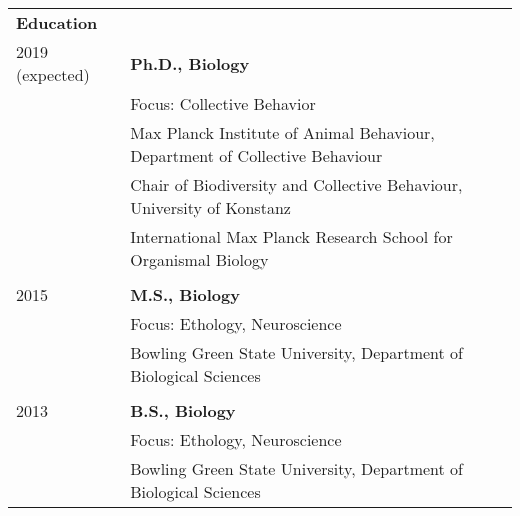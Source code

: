 \documentclass[letterpaper,10pt,oneside]{article}
\begin{document}
\noindent \begin{longtable}{@{} l p{5.3in}l}



\Large{\textbf{Education}} \vspace{5mm} \\
 \large{2019 (expected)} 
 & \textbf{Ph.D., Biology} \\
 & Focus: Collective Behavior \\
 & {Max Planck Institute of Animal Behaviour, Department of Collective Behaviour} \\
  & {Chair of Biodiversity and Collective Behaviour, University of Konstanz} \\
 	& {International Max Planck Research School for Organismal Biology} \\
     
     & \\
 \large{2015} 
  & \textbf{M.S., Biology} \\
 & Focus: Ethology, Neuroscience \\
     & {Bowling Green State University, Department of Biological Sciences} \\
    
     & \\
 \large{2013} 
  &\textbf{B.S., Biology} \\
 & Focus: Ethology, Neuroscience \\
      & {Bowling Green State University, Department of Biological Sciences} \\
    

\end{longtable}
\end{document}
